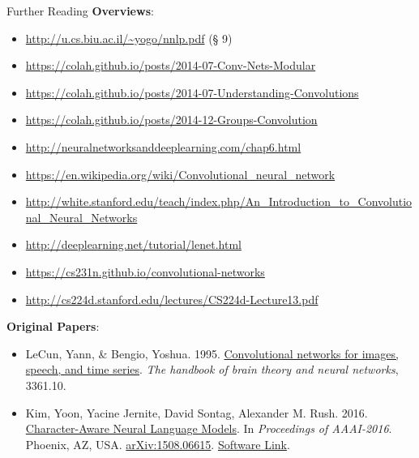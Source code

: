\documentclass[xcolor=pdftex,x11names,table,hyperref]{beamer}
\newcommand{\Conv}{Convolutional}
\begin{document}


\begin{frame}{Further Reading}
\textbf{Overviews}:
\begin{tiny}
\begin{itemize}
	\item \url{http://u.cs.biu.ac.il/~yogo/nnlp.pdf} (\S{} 9)
	\item \url{https://colah.github.io/posts/2014-07-Conv-Nets-Modular}
	\item \url{https://colah.github.io/posts/2014-07-Understanding-Convolutions}
	\item \url{https://colah.github.io/posts/2014-12-Groups-Convolution}
	\item \url{http://neuralnetworksanddeeplearning.com/chap6.html}
	\item \url{https://en.wikipedia.org/wiki/Convolutional_neural_network}
	\item \url{http://white.stanford.edu/teach/index.php/An_Introduction_to_Convolutional_Neural_Networks}
	\item \url{http://deeplearning.net/tutorial/lenet.html}
	\item \url{https://cs231n.github.io/convolutional-networks}
	\item \url{http://cs224d.stanford.edu/lectures/CS224d-Lecture13.pdf}
\end{itemize}
\end{tiny}
\textbf{Original Papers}:
\begin{tiny}
\begin{itemize}
	\item LeCun, Yann, \& Bengio, Yoshua. 1995. \href{http://www.iro.umontreal.ca/~lisa/pointeurs/handbook-convo.pdf}{\Conv{} networks for images, speech, and time series}. \textit{The handbook of brain theory and neural networks}, 3361.10.
	\item Kim, Yoon, Yacine Jernite, David Sontag, Alexander M. Rush. 2016. \href{http://arxiv.org/abs/1508.06615}{Character-Aware Neural Language Models}.  In \textit{Proceedings of AAAI-2016}. Phoenix, AZ, USA. \href{http://arxiv.org/abs/1508.06615}{arXiv:1508.06615}. \href{https://github.com/yoonkim/lstm-char-cnn}{Software Link}.
\end{itemize}
\end{tiny}
\end{frame}





\end{document}

